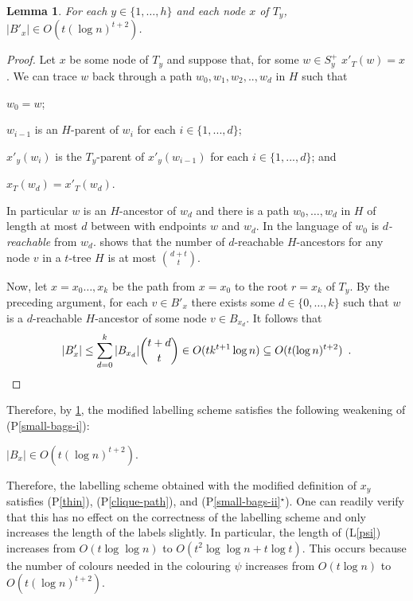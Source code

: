 \documentclass{patmorin}
\newcommand{\pref}[1]{(P\ref{#1})}
\newcommand{\psref}[1]{(P\ref{#1}$^{\star}$)}
\newtheorem{lemma}{Lemma}
\begin{document}
\begin{lemma}\label{small-bags-ii-lem}
    For each $y\in\{1,\ldots,h\}$ and each node $x$ of $T_y$, $|B'_x|\in O(t(\log n)^{t+2})$.
\end{lemma}

\begin{proof}
    Let $x$ be some node of $T_y$ and suppose that, for some $w\in S^+_y$ $x'_T(w)=x$.  We can trace $w$ back through a path $w_0,w_1,w_2,..,w_d$ in $H$ such that
    \begin{compactenum}[(a)]
        \item $w_0=w$;
        \item $w_{i-1}$ is an $H$-parent of $w_i$ for each $i\in\{1,...,d\}$;
        \item $x'_y(w_{i})$ is the $T_y$-parent of $x'_y(w_{i-1})$ for each $i\in\{1,...,d\}$; and
        \item $x_T(w_d)=x'_T(w_d)$.
    \end{compactenum}
    In particular $w$ is an $H$-ancestor of $w_d$ and there is a path $w_0,\ldots,w_d$ in $H$ of length at most $d$ between with endpoints $w$ and $w_d$.  In the language of \citet{pilipczuk.siebertz:polynomial} $w_0$ is \emph{$d$-reachable} from $w_d$.  \citet[Lemma~13]{pilipczuk.siebertz:polynomial-arxiv} shows that the number of $d$-reachable $H$-ancestors for any node $v$ in a $t$-tree $H$ is at most $\binom{d+t}{t}$.

    Now, let $x=x_0\ldots,x_k$ be the path from $x=x_0$ to the root $r=x_k$ of $T_y$. By the preceding argument, for each $v\in B'_x$ there exists some $d\in\{0,\ldots,k\}$ such that $w$ is a $d$-reachable $H$-ancestor of some node $v\in B_{x_d}$.  It follows that
    \[
        |B'_x|
            \le \sum_{d=0}^k |B_{x_d}|\binom{t+d}{t}
            \in O(tk^{t+1}\log n)
            \subseteq O(t(\log n)^{t+2}) \enspace . \qedhere
    \]
\end{proof}

Therefore, by \cref{small-bags-ii-lem}, the modified labelling scheme satisfies the following weakening of \pref{small-bags-i}:

\begin{compactenum}[(P1$^{\star}$)]\setcounter{enumi}{2}
    \item $|B_x|\in O(t(\log n)^{t+2})$. \label{small-bags-ii}
\end{compactenum}

Therefore, the labelling scheme obtained with the modified definition of $x_y$ satisfies \pref{thin}, \pref{clique-path}, and \psref{small-bags-ii}.  One can readily verify that this has no effect on the correctness of the labelling scheme and only increases the length of the labels slightly.  In particular, the length of (L\ref{psi}) increases from $O(t\log\log n)$ to $O(t^2\log\log n + t\log t)$.  This occurs because the number of colours needed in the colouring $\psi$ increases from $O(t\log n)$ to $O(t(\log n)^{t+2})$.
\end{document}
